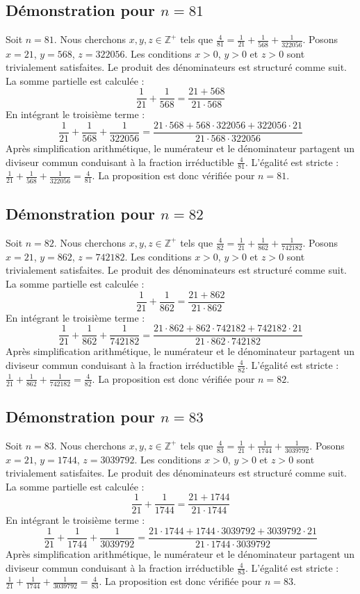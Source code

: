 \documentclass[11pt,a4paper]{article}
\begin{document}
\subsection{Démonstration pour $n = 81$}
Soit $n = 81$. Nous cherchons $x, y, z \in \mathbb{Z}^{+}$ tels que $\frac{4}{81} = \frac{1}{21} + \frac{1}{568} + \frac{1}{322056}$.
Posons $x = 21$, $y = 568$, $z = 322056$.
Les conditions $x > 0$, $y > 0$ et $z > 0$ sont trivialement satisfaites.
Le produit des dénominateurs est structuré comme suit. La somme partielle est calculée :
$$ \frac{1}{21} + \frac{1}{568} = \frac{21+568}{21 \cdot 568} $$
En intégrant le troisième terme :
$$ \frac{1}{21} + \frac{1}{568} + \frac{1}{322056} = \frac{21 \cdot 568 + 568 \cdot 322056 + 322056 \cdot 21}{21 \cdot 568 \cdot 322056} $$
Après simplification arithmétique, le numérateur et le dénominateur partagent un diviseur commun conduisant à la fraction irréductible $\frac{4}{81}$.
L'égalité est stricte : $\frac{1}{21} + \frac{1}{568} + \frac{1}{322056} = \frac{4}{81}$.
La proposition est donc vérifiée pour $n = 81$.
\subsection{Démonstration pour $n = 82$}
Soit $n = 82$. Nous cherchons $x, y, z \in \mathbb{Z}^{+}$ tels que $\frac{4}{82} = \frac{1}{21} + \frac{1}{862} + \frac{1}{742182}$.
Posons $x = 21$, $y = 862$, $z = 742182$.
Les conditions $x > 0$, $y > 0$ et $z > 0$ sont trivialement satisfaites.
Le produit des dénominateurs est structuré comme suit. La somme partielle est calculée :
$$ \frac{1}{21} + \frac{1}{862} = \frac{21+862}{21 \cdot 862} $$
En intégrant le troisième terme :
$$ \frac{1}{21} + \frac{1}{862} + \frac{1}{742182} = \frac{21 \cdot 862 + 862 \cdot 742182 + 742182 \cdot 21}{21 \cdot 862 \cdot 742182} $$
Après simplification arithmétique, le numérateur et le dénominateur partagent un diviseur commun conduisant à la fraction irréductible $\frac{4}{82}$.
L'égalité est stricte : $\frac{1}{21} + \frac{1}{862} + \frac{1}{742182} = \frac{4}{82}$.
La proposition est donc vérifiée pour $n = 82$.
\subsection{Démonstration pour $n = 83$}
Soit $n = 83$. Nous cherchons $x, y, z \in \mathbb{Z}^{+}$ tels que $\frac{4}{83} = \frac{1}{21} + \frac{1}{1744} + \frac{1}{3039792}$.
Posons $x = 21$, $y = 1744$, $z = 3039792$.
Les conditions $x > 0$, $y > 0$ et $z > 0$ sont trivialement satisfaites.
Le produit des dénominateurs est structuré comme suit. La somme partielle est calculée :
$$ \frac{1}{21} + \frac{1}{1744} = \frac{21+1744}{21 \cdot 1744} $$
En intégrant le troisième terme :
$$ \frac{1}{21} + \frac{1}{1744} + \frac{1}{3039792} = \frac{21 \cdot 1744 + 1744 \cdot 3039792 + 3039792 \cdot 21}{21 \cdot 1744 \cdot 3039792} $$
Après simplification arithmétique, le numérateur et le dénominateur partagent un diviseur commun conduisant à la fraction irréductible $\frac{4}{83}$.
L'égalité est stricte : $\frac{1}{21} + \frac{1}{1744} + \frac{1}{3039792} = \frac{4}{83}$.
La proposition est donc vérifiée pour $n = 83$.
\end{document}
